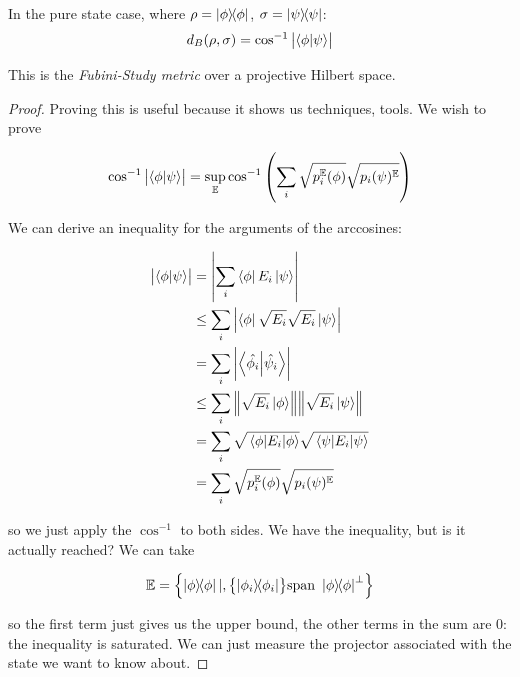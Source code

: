 \documentclass[main.tex]{subfiles}
\begin{document}
\begin{claim}
    In the pure state case, where \(\rho = \ketbra{\phi}\), \(\sigma = \ketbra{\psi}\):
    \begin{equation}
        d_B (\rho, \sigma) = \cos^{-1} \abs{\braket{\phi}{\psi}}
    \end{equation}
\end{claim}

This is the \emph{Fubini-Study metric} over a projective Hilbert space.

\begin{proof}

Proving this is useful because it shows us techniques, tools.
We wish to prove

\begin{equation}
  \cos ^{-1} \abs{\braket{\phi}{\psi}}
  = \sup_{\mathbb E}
  \cos ^{-1} \qty(\sum_i \sqrt{p_i ^{\mathbb{E}} (\phi)} \sqrt{p_i(\psi)^{\mathbb{E}}})
\end{equation}

We can derive an inequality for the arguments of the arccosines:

\begin{subequations}
\begin{align}
  \abs{\braket{\phi}{\psi}} &= \abs{\sum_i \bra{\phi} E_i \ket{\psi}}  \\
  &\leq \sum_i \abs{\bra{\phi} \sqrt{E _{i} } \sqrt{E _{i}} \ket{\psi}}  \\
  &= \sum _{i} \abs{\braket{\hat{\phi_i}}{\hat{\psi_i}}}  \\
  &\leq \sum_i \norm{\sqrt{E_i} \ket{\phi}}\norm{\sqrt{E_i} \ket{\psi}}  \\
  &= \sum_i \sqrt{\ev{E_i}{\phi}} \sqrt{\ev{E_i}{\psi}}  \\
  &= \sum_i \sqrt{p_i ^{\mathbb{E}} (\phi)} \sqrt{p_i(\psi)^{\mathbb{E}}}
\end{align}
\end{subequations}

so we just apply the \( \cos ^{-1} \) to both sides. We have the inequality, but is it actually reached? We can take

\begin{equation}
  \mathbb{E} = \qty{\ketbra{\phi} | , \qty{\ketbra{\phi_i}} \text{span } \ketbra{\phi}^{\perp}}
\end{equation}

so the first term just gives us the upper bound, the other terms in the sum are 0: the inequality is saturated. We can just measure the projector associated with the state we want to know about.
\end{proof}
\end{document}
